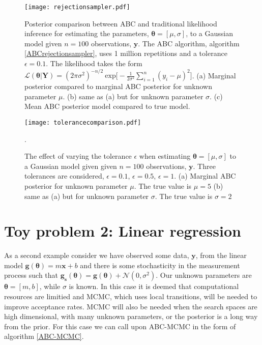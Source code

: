 \begin{figure}[H]
	\centering
	\texttt{[image: rejectionsampler.pdf]}
	\caption{Posterior comparison between ABC and traditional likelihood inference for estimating the parameters, $\bm{\theta} = [\mu,\sigma]$, to a Gaussian model given $n = 100$ observations, $\bm{y}$. The ABC algorithm, algorithm \ref{ABCrejectionsampler}, uses 1 million repetitions and a tolerance $\epsilon = 0.1$. The likelihood takes the form $\mathcal{L}(\bm{\theta}|\bm{Y}) = (2\pi\sigma^2)^{-n/2}\ \text{exp}\big[-\frac{1}{2\sigma^2}\sum_{i = 1}^{n}(y_i-\mu)^2\big]$. (a) Marginal posterior compared to marginal ABC posterior for unknown parameter $\mu$. (b) same as (a) but for unknown parameter $\sigma$. (c) Mean ABC posterior model compared to true model.}
	\label{toy1-fig1}
\end{figure}

\begin{figure}[H]
	\centering
	\texttt{[image: tolerancecomparison.pdf]}
	\caption{The effect of varying the tolerance $\epsilon$ when estimating $\bm{\theta} = [\mu,\sigma]$ to a Gaussian model given given $n = 100$ observations, $\bm{y}$. Three tolerances are considered, $\epsilon = 0.1$, $\epsilon = 0.5$, $\epsilon = 1$. (a) Marginal ABC posterior for unknown parameter $\mu$. The true value is $\mu = 5$ (b) same as (a) but for unknown parameter $\sigma$. The true value is $\sigma = 2$}.
	\label{toy1-fig2}
\end{figure}

\section{Toy problem 2: Linear regression}
\label{sec-lin-reg}

As a second example consider we have observed some data, $\bm{y}$, from the linear model $\bm{g}(\bm{\theta}) = m\bm{x} + b$ and there is some stochasticity in the measurement process such that $\bm{g_s}(\bm{\theta}) = \bm{g}(\bm{\theta}) + \mathcal{N}(0,\sigma^2)$. Our unknown parameters are $\bm{\theta} = [m,b]$, while $\sigma$ is known. In this case it is deemed that computational resources are limitied and MCMC, which uses local transitions, will be needed to improve acceptance rates. MCMC will also be needed when the search spaces are high dimensional, with many unknown parameters, or the posterior is a long way from the prior. For this case we can call upon ABC-MCMC in the form of algorithm \ref{ABC-MCMC}. \\

